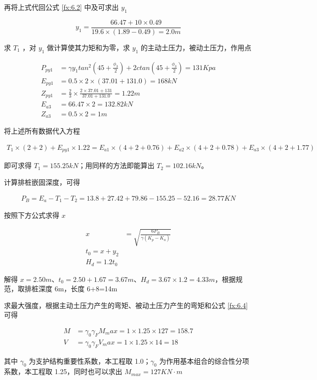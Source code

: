再将上式代回公式 \ref{fx:6.2} 中及可求出 $y_1$

\[y_1=\frac{66.47+10\times 0.49}{19.6\times(1.89-0.49)=2.0 m}\]

求 $T_1$ ，对 $y_1$ 做计算使其力矩和为零，求 $y_1$ 的主动土压力，被动土压力，作用点

\begin{align*}
    P_{py1}&=\gamma y_1tan^2(45+\frac{\phi_3}{2})+2ctan(45+\frac{\phi_3}{2})=131 Kpa\\
    E_{py1}&=0.5\times 2\times(37.01+131.0)=168 kN\\
    Z_{py1}&=\frac{2}{3}\times \frac{2\times 37.01+131}{37.01+131.0}=1.22 m\\
    E_{a3}&=66.47\times 2=132.82 kN\\
    Z_{a3}&=0.5\times 2=1 m
\end{align*}

将上述所有数据代入方程

\begin{align*}
T_1\times(2+2)+E_{py1}\times 1.22=E_{a1}\times(4+2+0.76)+E_{a2}\times(4+2+0.78)+E_{a3}\times(4+2+1.77)
\end{align*}

即可求得 $T_1=155.25kN$；用同样的方法即能算出 $T_2=102.16kN$。

计算排桩嵌固深度，可得

\begin{align*}
    P_B=E_a-T_1-T_2=13.8+27.42+79.86-155.25-52.16=28.77 KN
\end{align*}

按照下方公式求得 $x$

\begin{align}
    x&=\sqrt{\frac{6P_B}{\gamma (K_p-K_a)}}\\
    t_0=x+y_2\\
    H_d=1.2t_0
\end{align}

解得 $x=2.50m$、$t_0=2.50+1.67=3.67m$、$H_d=3.67\times 1.2=4.33m$，根据规范，取排桩深度 6m，长度 6+8=14m

求最大强度，根据主动土压力产生的弯矩、被动土压力产生的弯矩和公式 \ref{fx:6.4} 可得

\begin{align}
    \label{fx:6.4}
    M&=\gamma_0\gamma_FM_max=1\times 1.25\times 127=158.7\\
    V&=\gamma_0\gamma_FV_max=1\times 1.25\times 14=18
\end{align}

其中 $\gamma_0$ 为支护结构重要性系数，本工程取 1.0；$\gamma_0$ 为作用基本组合的综合性分项系数，本工程取 1.25，同时也可以求出
$M_{max}=127KN\cdot m$\\

